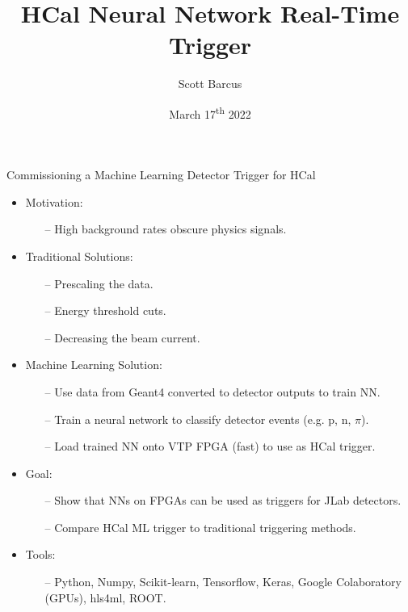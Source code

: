 \documentclass[10pt]{beamer}
\title{HCal Neural Network Real-Time Trigger}
\subtitle{}
\date{March 17\textsuperscript{th} 2022}
\author{Scott Barcus}
\begin{document}
\maketitle

\begin{frame}{Commissioning a Machine Learning Detector Trigger for HCal}

	\begin{itemize}
		\item \alert{Motivation:}
			\begin{itemize}
				\item[--] High background rates obscure physics signals.
			\end{itemize}
		\item \alert{Traditional Solutions:}
			\begin{itemize}
				\item[--] Prescaling the data.
				\item[--] Energy threshold cuts.
				\item[--] Decreasing the beam current.
			\end{itemize}
		\item \alert{Machine Learning Solution:}
			\begin{itemize}
				\item[--] Use data from Geant4 converted to detector outputs to train NN.
				\item[--] Train a neural network to classify detector events (e.g. p, n, $\pi$).
				\item[--] Load trained NN onto VTP FPGA (fast) to use as HCal trigger.
			\end{itemize}
		\item \alert{Goal:}
			\begin{itemize}
				\item[--] Show that NNs on FPGAs can be used as triggers for JLab detectors.
				\item[--] Compare HCal ML trigger to traditional triggering methods.
			\end{itemize}
		\item \alert{Tools:}
			\begin{itemize}
				\item[--] Python, Numpy, Scikit-learn, Tensorflow, Keras, Google Colaboratory (GPUs), hls4ml, ROOT.
			\end{itemize}
	\end{itemize}

\end{frame}
\end{document}
